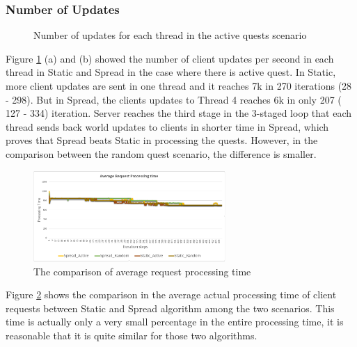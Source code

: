 \documentclass[12pt,a4paper]{article} %
\theoremstyle{definition}
\theoremstyle{remark}
\begin{document}
\subsubsection {Number of Updates}
\begin{figure}[!ht]
	\hfill
	\caption{Number of updates for each thread in the active quests scenario}
	\label{updates_active}
\end{figure}
Figure \ref{updates_active} (a) and (b) showed the number of client updates per second in each thread in Static and Spread in the case where there is active quest. 
In Static, more client updates are sent in one thread and it reaches 7k in 270 iterations (28 - 298). But in Spread, the clients
updates to Thread 4 reaches 6k in only 207 ( 127 - 334) iteration. Server reaches the third stage in the 3-staged loop
that each thread sends back world updates to clients in shorter time in Spread, which proves that Spread
beats Static in processing the quests. However, in the comparison between the random quest scenario, the difference is smaller.




\begin{figure}[htbp]
	\centering
	\includegraphics[width=0.65\textwidth]{Average_compare_request_processing_time.png}
	\caption{The comparison of average request processing time}\label{Cpt2_error}
\end{figure}
Figure \ref{Cpt2_error} shows the comparison in the average actual processing time of client requests between Static and
Spread algorithm among the two scenarios. This time is actually only a very small percentage in the entire processing time,
it is reasonable that it is quite similar for those two algorithms. 
\end{document}
